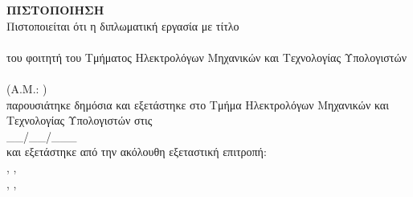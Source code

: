 \pagestyle{empty}
\begin{center}
  {\LARGE \textbf{ΠΙΣΤΟΠΟΙΗΣΗ}\\[1cm]}
  \large Πιστοποιείται ότι η διπλωματική εργασία με τίτλο\\[1cm]
  \textbf{\large \doctitle }\\[1cm]
  του φοιτητή του Τμήματος Ηλεκτρολόγων Μηχανικών και Τεχνολογίας Υπολογιστών\\[1.5cm]
  \me \\[0.5cm]
  (Α.Μ.: \studnum )\\[1.5cm]
  παρουσιάτηκε δημόσια και εξετάστηκε στο Tμήμα  Ηλεκτρολόγων Μηχανικών και Τεχνολογίας Υπολογιστών στις\\[1cm]
  \Large{\_\_/\_\_/\_\_\_}\\[1.5cm]
  και εξετάστηκε από την ακόλουθη εξεταστική επιτροπή:\\[1.5cm]
  \supname, \suptitle, \supdep\\[1.5cm]
  \cosupname, \cosuptitle, \cosupdep\\[1.5cm]
\end{center}
